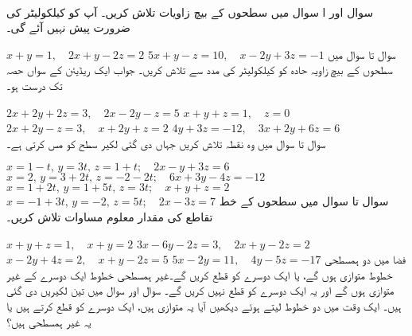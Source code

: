 \\
سوال  اور  ا سوال  میں سطحوں کے بیچ زاویات تلاش کریں۔ آپ کو کیلکولیٹر کی ضرورت پیش نہیں آئے گی۔

$x+y=1,\quad 2x+y-2z=2$
$5x+y-z=10,\quad x-2y+3z=-1$
سوال  تا سوال  میں سطحوں کے بیچ  زاویہ  حادہ کو کیلکولیٹر کی مدد سے تلاش کریں۔ جواب ایک ریڈیئن کے سواں حصہ تک درست  ہو۔

$2x+2y+2z=3,\quad 2x-2y-z=5$
$x+y+z=1,\quad z=0$
$2x+2y-z=3,\quad x+2y+z=2$
$4y+3z=-12,\quad 3x+2y+6z=6$
\\
سوال  تا سوال  میں وہ نقطہ تلاش کریں جہاں دی گئی لکیر سطح کو  مس کرتی ہے۔

$x=1-t,\,y=3t,\,z=1+t;\quad 2x-y+3z=6$
$x=2,\,y=3+2t,\,z=-2-2t;\quad 6x+3y-4z=-12$
$x=1+2t,\, y=1+5t,\,z=3t;\quad x+y+z=2$
$x=-1+3t,\,y=-2,\,z=5t;\quad 2x-3z=7$
سوال  تا سوال  میں سطحوں کے خط تقاطع کی مقدار معلوم مساوات تلاش کریں۔

$x+y+z=1,\quad x+y=2$
$3x-6y-2z=3,\quad 2x+y-2z=2$
$x-2y+4z=2,\quad x+y-2z=5$
$5x-2y=11,\quad 4y-5z=-17$
فضا میں  دو ہمسطحی   خطوط متوازی ہوں گے،  یا  ایک دوسرے کو قطع کریں گے۔غیر ہمسطحی خطوط ایک دوسرے کے غیر متوازی ہوں گے اور یہ ایک دوسرے کو قطع نہیں کریں گے۔ سوال  اور سوال  میں تین لکیریں  دی گئی ہیں۔  ایک وقت میں دو خطوط  لیتے ہوئے دیکھیں آیا یہ متوازی ہیں،   ایک دوسرے کو قطع کرتے ہیں یا یہ غیر ہمسطحی ہیں؟

